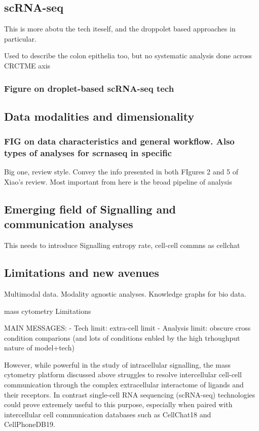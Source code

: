 \subsection{scRNA-seq}

This is more abotu the tech iteself, and the droppolet based approaches in particular.

Used to describe the colon epithelia too, but no systematic analysis done across CRCTME axis 

\subsubsection{Figure on droplet-based scRNA-seq tech}


\subsection{Data modalities and dimensionality}

\subsubsection{FIG on data characteristics and general workflow. Also types of analyses for scrnaseq in specific}
Big one, review style.
Convey the info presented in both FIgures 2 and 5 of Xiao's review. Most important from here is the broad pipeline of analysis

\subsection{Emerging field of Signalling and communication analyses}

This needs to introduce Signalling entropy rate, cell-cell commns as cellchat

\subsection{Limitations and new avenues}

Multimodal data. Modality agnostic analyses. Knowledge graphs for bio data.


mass cytometry Limitations

MAIN MESSAGES:
- Tech limit: extra-cell limit
- Analysis limit: obscure cross condition comparions (and lots of conditions enbled by the high trhoughput nature of model+tech)

However, while powerful in the study of intracellular signalling, the mass cytometry platform discussed above struggles to resolve intercellular cell-cell communication through the complex extracellular interactome of ligands and their receptors. In contrast single-cell RNA sequencing (scRNA-seq) technologies could prove extremely useful to this purpose, especially when paired with intercellular cell communication databases such as CellChat18 and CellPhoneDB19.


